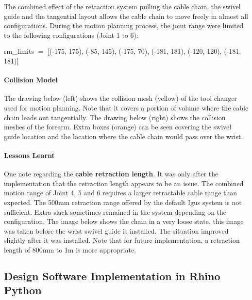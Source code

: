 The combined effect of the retraction system pulling the cable chain, the swivel guide and the tangential layout allows the cable chain to move freely in almost all configurations. During the motion planning process, the joint range were limited to the following configurations (Joint 1 to 6):

{\footnotesize rm\_limits $=$ [(-175, 175), (-85, 145), (-175, 70), (-181, 181), (-120, 120), (-181, 181)]}





\paragraph{Collision Model}

The drawing below (left) shows the collision mesh (yellow) of the tool changer used for motion planning. Note that it covers a portion of volume where the cable chain leads out tangentially. The drawing below (right) shows the collision meshes of the forearm. Extra boxes (orange) can be seen covering the swivel guide location and the location where the cable chain would pass over the wrist.



\paragraph{Lessons Learnt}

One note regarding the \textbf{cable retraction length}. It was only after the implementation that the retraction length appears to be an issue. The combined motion range of Joint 4, 5 and 6 requires a larger retractable cable range than expected. The 500mm retraction range offered by the default Igus system is not sufficient. Extra slack sometimes remained in the system depending on the configuration. The image below shows the chain in a very loose state, this image was taken before the wrist swivel guide is installed. The situation improved slightly after it was installed. Note that for future implementation, a retraction length of 800mm to 1m is more appropriate.



\subsection{Design Software Implementation in Rhino Python}
\label{subsection:exploration_3_design_software_implementation_in_rhino_python}

